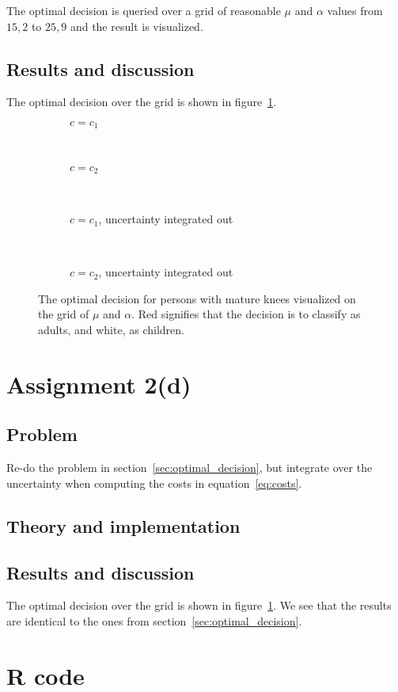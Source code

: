 \documentclass[11pt, a4paper]{article}
\begin{document}
The optimal decision is queried over a grid of reasonable $\mu$ and $\alpha$ values
from $15, 2$ to $25, 9$ and the result is visualized.
\subsection{Results and discussion}
The optimal decision over the grid is shown in figure~\ref{fig:optimal_decision}.

\begin{figure}
	\centering
	\begin{subfigure}[b]{0.4\textwidth}
		
		\caption{$c = c_1$}
	\end{subfigure}
	~
	\begin{subfigure}[b]{0.4\textwidth}
		
		\caption{$c = c_2$}
	\end{subfigure}
	~
	\begin{subfigure}[b]{0.4\textwidth}
		
		\caption{$c = c_1$, uncertainty integrated out}
	\end{subfigure}
	~
	\begin{subfigure}[b]{0.4\textwidth}
		
		\caption{$c = c_2$, uncertainty integrated out}
	\end{subfigure}

	\caption{The optimal decision for persons with mature knees visualized on
		the grid of $\mu$ and $\alpha$.
		Red signifies that the decision is to classify as adults, and white, as children.
		\label{fig:optimal_decision}}
\end{figure}

\section{Assignment 2(d)}
\subsection{Problem}
Re-do the problem in section~\ref{sec:optimal_decision},
but integrate over the uncertainty when computing the costs in equation~\ref{eq:costs}.
\subsection{Theory and implementation}
\subsection{Results and discussion}
The optimal decision over the grid is shown in figure~\ref{fig:optimal_decision}.
We see that the results are identical to the ones from section~\ref{sec:optimal_decision}.

\clearpage
\appendix %

\section{R code}

\end{document}
